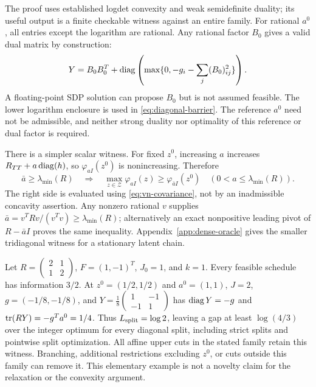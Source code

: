 The proof uses established logdet convexity and weak semidefinite duality;
its useful output is a finite checkable witness against an entire family.
For rational $a^0$, all entries except the logarithm are rational. Any
rational factor $B_0$ gives a valid dual matrix by construction:
\begin{equation}\label{eq:dual-repair}
 Y=B_0B_0^T+\operatorname{diag}\left(\max\{0,-g_i-\sum_j(B_0)_{ij}^2\}\right).
\end{equation}
A floating-point SDP solution can propose $B_0$ but is not assumed feasible.
The lower logarithm enclosure is used in \eqref{eq:diagonal-barrier}.
The reference $a^0$ need not be admissible, and neither strong duality
nor optimality of this reference or dual factor is required.

There is a simpler scalar witness. For fixed $z^0$, increasing $a$ increases
$R_{TT}+a\operatorname{diag}(h)$, so $\varphi_{aI}(z^0)$ is nonincreasing. Therefore
\begin{equation}\label{eq:scalar-barrier}
 \bar a\ge\lambda_{\min}(R)\quad\Longrightarrow\quad
 \max_{z\in\mathcal Z}\varphi_{aI}(z)
 \ge\varphi_{\bar aI}(z^0)\quad
 (0<a\le\lambda_{\min}(R)).
\end{equation}
The right side is evaluated using \eqref{eq:vn-covariance}, not by an
inadmissible concavity assertion. Any nonzero rational $v$ supplies
$\bar a=v^TRv/(v^Tv)\ge\lambda_{\min}(R)$; alternatively an exact nonpositive
leading pivot of $R-\bar aI$ proves the same inequality. Appendix~\ref{app:dense-oracle}
gives the smaller tridiagonal witness for a stationary latent chain.

\begin{example}\label{ex:split-barrier}
Let $R=\left(\begin{smallmatrix}2&1\\1&2\end{smallmatrix}\right)$,
$F=(1,-1)^T$, $J_0=1$, and $k=1$. Every feasible schedule has information
$3/2$. At $z^0=(1/2,1/2)$ and $a^0=(1,1)$, $J=2$,
$g=(-1/8,-1/8)$, and
$Y=\frac18\left(\begin{smallmatrix}1&-1\\-1&1\end{smallmatrix}\right)$
has $\operatorname{diag} Y=-g$ and $\operatorname{tr}(RY)=-g^Ta^0=1/4$.
Thus $L_{\rm split}=\log2$, leaving a gap at least $\log(4/3)$ over the
integer optimum for every diagonal split, including strict splits and
pointwise split optimization. All affine upper cuts in the stated family
retain this witness. Branching, additional restrictions excluding $z^0$,
or cuts outside this family can remove it. This elementary example is not
a novelty claim for the relaxation or the convexity argument.
\end{example}


